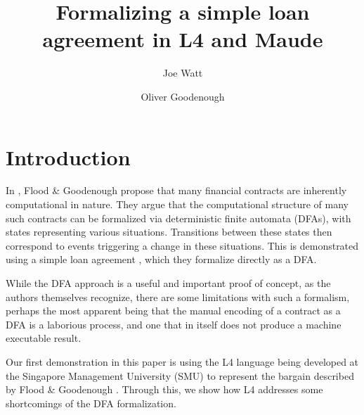 \documentclass{article}
\title{Formalizing a simple loan agreement in L4 and Maude}
\author{
  Joe Watt
  \and
  Oliver Goodenough
}
\begin{document}
\maketitle


\tableofcontents

\newpage


\section{Introduction}



In \cite{contract_as_automaton}, Flood \& Goodenough propose that many
financial contracts are inherently computational in nature.
They argue that the computational structure of many such contracts can be
formalized via deterministic finite automata (DFAs), with states representing
various situations.
Transitions between these states then correspond to events triggering a change
in these situations.
This is demonstrated using a simple loan agreement \cite{contract_as_automaton},
which they formalize directly as a DFA.

While the DFA approach is a useful and important proof of concept, as the authors
themselves recognize, there are some limitations with such a formalism, perhaps
the most apparent being that the manual encoding of a contract as a DFA is a
laborious process, and one that in itself does not produce a machine executable
result.

Our first demonstration in this paper is using the L4 language being developed
at the Singapore Management University (SMU)
to represent the bargain described by Flood \& Goodenough
\cite{contract_as_automaton}.
Through this, we show how L4 addresses some shortcomings of the DFA
formalization.
\end{document}
